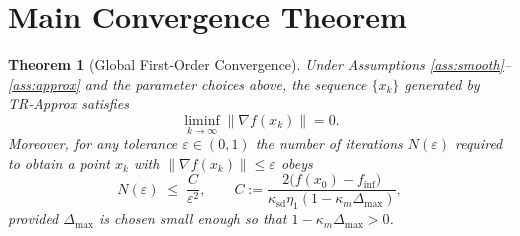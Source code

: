 \documentclass{article}
\newtheorem{theorem}{Theorem}
\newcommand{\norm}[1]{\left\lVert#1\right\rVert}
\begin{document}
\section*{Main Convergence Theorem}
\begin{theorem}[Global First‑Order Convergence]\label{thm:global}
Under Assumptions \ref{ass:smooth}–\ref{ass:approx} and the parameter choices above, the sequence $\{x_{k}\}$ generated by TR‑Approx satisfies
\[
\liminf_{k\to\infty}\norm{\nabla f(x_{k})}=0.
\]
Moreover, for any tolerance $\varepsilon\in(0,1)$ the number of iterations $N(\varepsilon)$ required to obtain a point $x_{k}$ with $\norm{\nabla f(x_{k})}\le\varepsilon$ obeys
\begin{equation}
\label{eq:complexity}
N(\varepsilon)\;\le\;
\frac{C}{\varepsilon^{2}},
\qquad
C:=\frac{2\bigl(f(x_{0})-f_{\inf}\bigr)}{\kappa_{\mathrm{sd}}\eta_{1}(1-\kappa_{m}\Delta_{\max})},
\end{equation}
provided $\Delta_{\max}$ is chosen small enough so that $1-\kappa_{m}\Delta_{\max}>0$.
\end{theorem}
\end{document}
